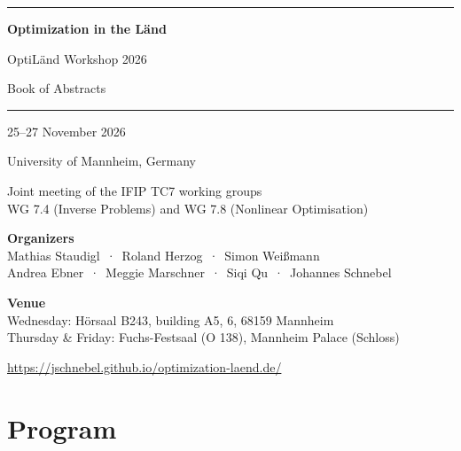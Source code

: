 \documentclass[11pt,a4paper]{article}
\affil{}{#4}
\affil{}{#4}
\begin{document}
\begin{titlepage}
  \centering
  \vspace*{3.5cm}
  {\color{accent}\rule{\linewidth}{1.2pt}}\par
  \vspace{1.2cm}
  {\Huge\bfseries Optimization in the Länd\par}
  \vspace{0.4cm}
  {\LARGE OptiLänd Workshop 2026\par}
  \vspace{1.2cm}
  {\Huge\color{accent}Book of Abstracts\par}
  \vspace{1.2cm}
  {\color{accent}\rule{\linewidth}{1.2pt}}\par
  \vspace{1.2cm}
  {\Large 25--27 November 2026\par}
  \vspace{0.3cm}
  {\large University of Mannheim, Germany\par}
  \vspace{1.5cm}
  {\normalsize Joint meeting of the IFIP TC7 working groups\\
   WG 7.4 (Inverse Problems) and WG 7.8 (Nonlinear Optimisation)\par}
  \vfill
  {\small
  \textbf{Organizers}\\[0.3em]
  Mathias Staudigl \,·\, Roland Herzog \,·\, Simon Weißmann\\
  Andrea Ebner \,·\, Meggie Marschner \,·\, Siqi Qu \,·\, Johannes Schnebel\par
  \vspace{0.8cm}
  \textbf{Venue}\\[0.3em]
  Wednesday: Hörsaal B243, building A5, 6, 68159 Mannheim\\
  Thursday \& Friday: Fuchs-Festsaal (O 138), Mannheim Palace (Schloss)\par
  \vspace{0.8cm}
  \url{https://jschnebel.github.io/optimization-laend.de/}\par}
\end{titlepage}

\section*{Program}
\vspace{-0.6em}
\end{document}
